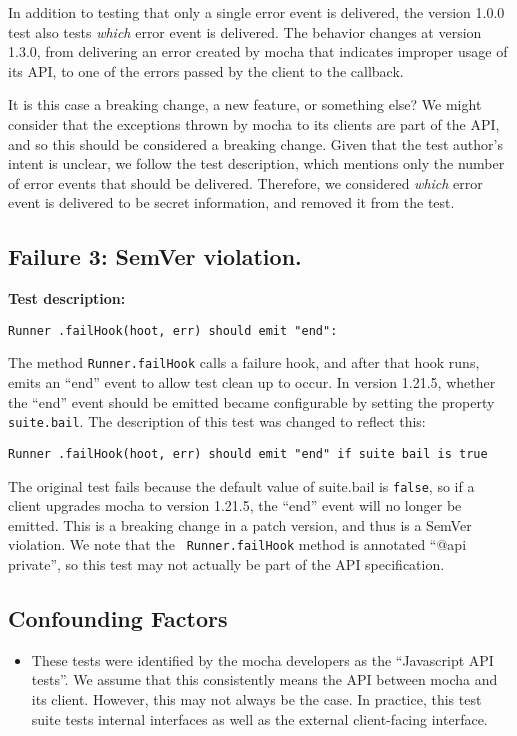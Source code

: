 In addition to testing that only a single error event is delivered,
the version 1.0.0 test also tests {\em which} error event is
delivered. The behavior changes at version 1.3.0, from delivering an
error created by mocha that indicates improper usage of its API, to
one of the errors passed by the client to the callback.  

It is this case a breaking change, a new feature, or something else?
We might consider that the exceptions thrown by mocha to its clients
are part of the API, and so this should be considered a breaking
change.  Given that the test author's intent is unclear, we follow the
test description, which mentions only the number of error events that
should be delivered. Therefore, we considered {\em which} error event
is delivered to be secret information, and removed it from the test.

\subsection{Failure 3: SemVer violation.}

{\bf Test description:}
\begin{verbatim}
Runner .failHook(hoot, err) should emit "end":
\end{verbatim}

The method {\tt Runner.failHook} calls a failure hook, and after that
hook runs, emits an ``end'' event to allow test clean up to occur. In
version 1.21.5, whether the ``end'' event should be emitted became
configurable by setting the property {\tt suite.bail}.  The
description of this test was changed to reflect this:

\begin{verbatim}
Runner .failHook(hoot, err) should emit "end" if suite bail is true
\end{verbatim}

The original test fails because the default value of suite.bail is
{\tt false}, so if a client upgrades mocha to version 1.21.5, the
``end'' event will no longer be emitted. This is a breaking change in
a patch version, and thus is a SemVer violation. We note that the {\tt
  Runner.failHook} method is annotated ``@api private'', so this test
may not actually be part of the API specification.

\subsection{Confounding Factors}
\begin{itemize}
\item These tests were identified by the mocha developers as the
  ``Javascript API tests''. We assume that this consistently means the
  API between mocha and its client. However, this may not always be
  the case. In practice, this test suite tests internal interfaces as
  well as the external client-facing interface. 
\end{itemize}